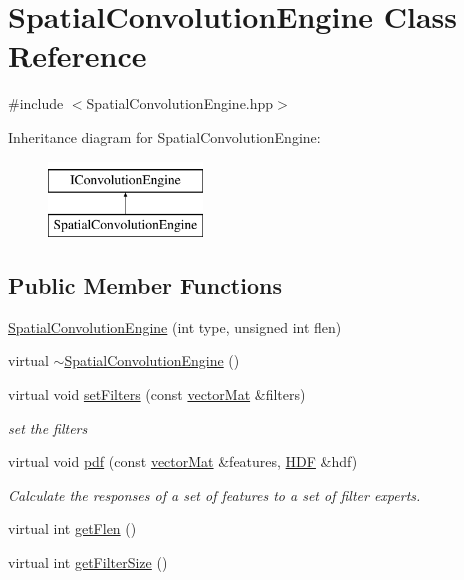 \hypertarget{classSpatialConvolutionEngine}{\section{Spatial\-Convolution\-Engine Class Reference}
\label{classSpatialConvolutionEngine}
}


{\ttfamily \#include $<$Spatial\-Convolution\-Engine.\-hpp$>$}

Inheritance diagram for Spatial\-Convolution\-Engine\-:\begin{figure}[H]
\begin{center}
\leavevmode
\includegraphics[height=2.000000cm]{classSpatialConvolutionEngine}
\end{center}
\end{figure}
\subsection*{Public Member Functions}
\begin{DoxyCompactItemize}
\item 
\hyperlink{classSpatialConvolutionEngine_a9efb2b7de50aaf86ad6bcb56a953d447}{Spatial\-Convolution\-Engine} (int type, unsigned int flen)
\item 
virtual \hyperlink{classSpatialConvolutionEngine_a07b28be0c28a1c47bc6f2a7459155802}{$\sim$\-Spatial\-Convolution\-Engine} ()
\item 
virtual void \hyperlink{classSpatialConvolutionEngine_ad27aad7b65dfa3ec6a617eed96c01d9c}{set\-Filters} (const \hyperlink{types_8hpp_a3207a7addcfa415d1c83622febcb1e9b}{vector\-Mat} \&filters)
\begin{DoxyCompactList}\small\item\em set the filters \end{DoxyCompactList}\item 
virtual void \hyperlink{classSpatialConvolutionEngine_af563e1f3d82b37b51cefb48a32b8247c}{pdf} (const \hyperlink{types_8hpp_a3207a7addcfa415d1c83622febcb1e9b}{vector\-Mat} \&features, \hyperlink{classHDF}{H\-D\-F} \&hdf)
\begin{DoxyCompactList}\small\item\em Calculate the responses of a set of features to a set of filter experts. \end{DoxyCompactList}\item 
virtual int \hyperlink{classSpatialConvolutionEngine_ac44ef96556679956f109fdae5bd25b38}{get\-Flen} ()
\item 
virtual int \hyperlink{classSpatialConvolutionEngine_a482075ebca8ddd3e2b777d22411864f1}{get\-Filter\-Size} ()
\end{DoxyCompactItemize}

